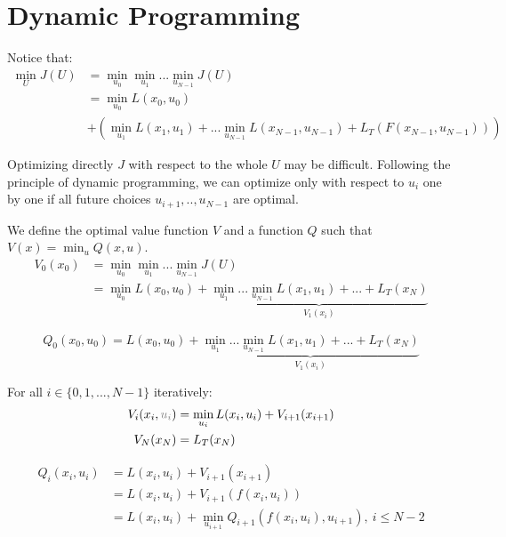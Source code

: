 \documentclass{report}
\begin{document}
\section{Dynamic Programming}
Notice that:
\begin{equation}
\begin{split}
\min_{U} J(U) &= \min_{u_0} \min_{u_1} ... \min_{u_{N-1}} J(U) \\
					 &= \min_{u_0} L(x_0, u_0)  \\
					 &+ (\min_{u_1} L(x_1, u_1) +... \min_{u_{N-1}}L(x_{N-1}, u_{N-1}) + L_T(F(x_{N-1}, u_{N-1})))
\end{split}
\end{equation}

Optimizing directly $J$ with respect to the whole $U$ may be difficult. Following the principle of dynamic programming, we can optimize only with respect to $u_i$ one by one if all future choices $u_{i+1}, .., u_{N-1}$ are optimal. 

\medskip
We define the optimal value function $V$ and a function $Q$ such that $V(x) = \min_{u} Q(x, u)$.
\begin{equation}
\begin{split}
V_0(x_0) &= \min_{u_0} \min_{u_1} ... \min_{u_{N-1}} J(U) \\
			&= \min_{u_0} L(x_0, u_0)  + \underbrace{\min_{u_1} ... \min_{u_{N-1}} L(x_1, u_1)+... +L_T(x_N)}_{V_1(x_i)}
\end{split}
\end{equation}


\begin{equation}
Q_0(x_0, u_0) =L(x_0, u_0)  +\underbrace{\min_{u_1} ... \min_{u_{N-1}} L(x_1, u_1)+... +L_T(x_N)}_{V_1(x_i)}
\end{equation}


\medskip

For all  $i\in \{0, 1, ..., N-1\}$ iteratively:
\begin{equation}
\begin{split}
\label{vl}
V_i(x_i,\textcolor{gray}{u_i} ) &= \min_{u_i}L(x_i,u_i) + V_{i+1}(x_{i+1}) \\
		V_N(x_N) &= L_T(x_N)
\end{split}
\end{equation}

\begin{equation}
\begin{split}
Q_i(x_i,u_i) &= L(x_i,u_i) + V_{i+1}(x_{i+1}) \\
				&= L(x_i,u_i) + V_{i+1}(f(x_i,u_i)) \\
				&= L(x_i,u_i) + \min_{u_{i+1}} Q_{i+1}(f(x_i,u_i), u_{i+1}),\ i \le N-2
\end{split}
\end{equation}
\end{document}
